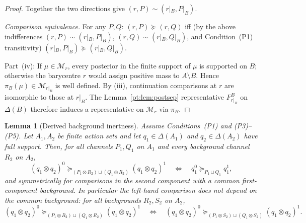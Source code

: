 \documentclass[11pt,a4paper]{article}
\newtheorem{lemma}[theorem]{Lemma}
\theoremstyle{definition}
\newcommand{\1}{\mathbf 1}
\begin{document}
\begin{proof}
Together the two directions give $(r,P)\sim(r|_B,P|_B)$.

\emph{Comparison equivalence.}  For any $P,Q$: $(r,P)\succeq(r,Q)$ iff (by the above indifferences $(r,P)\sim(r|_B,P|_B)$,
$(r,Q)\sim(r|_B,Q|_B)$, and Condition~\textup{(P1)} transitivity) $(r|_B,P|_B)\succeq(r|_B,Q|_B)$.

Part~(iv): If $\mu\in\mathcal M_r$, every posterior in the finite support of $\mu$ is supported on $B$; otherwise the
barycentre $r$ would assign positive mass to $A\setminus B$.  Hence $\pi_B(\mu)\in\mathcal M_{r|_B}$ is well defined.
By (iii), continuation comparisons at $r$ are isomorphic to those at $r|_B$.  The Lemma~\ref{pt:lem:postsep} representative
$F_{r|_B}^B$ on $\Delta(B)$ therefore induces a representative on $\mathcal M_r$ via $\pi_B$.
\end{proof}

\begin{lemma}[Derived background inertness]\label{pt:lem:background}
Assume Conditions~\textup{(P1)} and \textup{(P3)}--\textup{(P5)}.  Let $A_1,A_2$ be finite action sets and let
$q_1\in\Delta(A_1)$ and $q_2\in\Delta(A_2)$ have full support.  Then, for all channels $P_1,Q_1$ on $A_1$ and every
background channel $R_2$ on $A_2$,
\begin{equation}
(q_1\otimes q_2)^0
\succeq_{(P_1\otimes R_2)\sqcup(Q_1\otimes R_2)}
(q_1\otimes q_2)^1
\quad\Longleftrightarrow\quad
q_1^0\succeq_{P_1\sqcup Q_1}q_1^1,
\tag{BI}\label{pt:eq:backgroundinert}
\end{equation}
and symmetrically for comparisons in the second component with a common first-component background.  In particular the
left-hand comparison does not depend on the common background: for all backgrounds $R_2,S_2$ on $A_2$,
\[
(q_1\otimes q_2)^0
\succeq_{(P_1\otimes R_2)\sqcup(Q_1\otimes R_2)}
(q_1\otimes q_2)^1
\quad\Longleftrightarrow\quad
(q_1\otimes q_2)^0
\succeq_{(P_1\otimes S_2)\sqcup(Q_1\otimes S_2)}
(q_1\otimes q_2)^1.
\]
\end{lemma}
\end{document}
